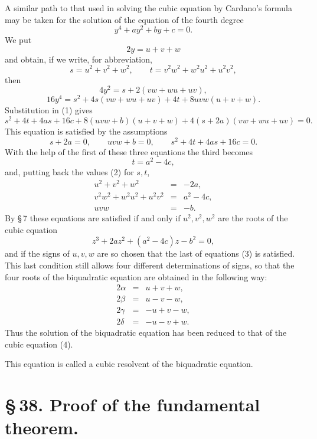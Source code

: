 \documentclass[11pt]{article}
\begin{document}
A similar path to that used in solving the cubic equation by Cardano's formula may be taken for the solution of the equation of the fourth degree
\begin{equation}
 y^4+ay^2+by+c=0.
\tag{1}
\end{equation}
We put
\[
 2y=u+v+w
\]
and obtain, if we write, for abbreviation,
\begin{equation}
 s=u^2+v^2+w^2,\qquad
 t=v^2w^2+w^2u^2+u^2v^2,
\tag{2}
\end{equation}
then
\[
 4y^2=s+2(vw+wu+uv),
\]
\[
 16y^4=s^2+4s(vw+wu+uv)+4t+8uvw(u+v+w).
\]
Substitution in (1) gives
\[
 s^2+4t+4as+16c+8(uvw+b)(u+v+w)
  +4(s+2a)(vw+wu+uv)=0.
\]
This equation is satisfied by the assumptions
\[
 s+2a=0,\qquad uvw+b=0,\qquad s^2+4t+4as+16c=0.
\]
With the help of the first of these three equations the third becomes
\[
 t=a^2-4c,
\]
and, putting back the values (2) for $s,t$,
\begin{equation}
\begin{array}{rcl}
 u^2+v^2+w^2&=&-2a,\\
 v^2w^2+w^2u^2+u^2v^2&=&a^2-4c,\\
 uvw&=&-b.
\end{array}
\tag{3}
\end{equation}
By \S\,7 these equations are satisfied if and only if $u^2,v^2,w^2$ are the roots of the cubic equation
\begin{equation}
 z^3+2az^2+(a^2-4c)z-b^2=0,
\tag{4}
\end{equation}
and if the signs of $u,v,w$ are so chosen that the last of equations (3) is satisfied. This last condition still allows four different determinations of signs, so that the four roots of the biquadratic equation are obtained in the following way:
\begin{equation}
\begin{array}{rcl}
2\alpha&=&u+v+w,\\
2\beta&=&u-v-w,\\
2\gamma&=&-u+v-w,\\
2\delta&=&-u-v+w.
\end{array}
\tag{5}
\end{equation}
Thus the solution of the biquadratic equation has been reduced to that of the cubic equation (4).

This equation is called a cubic resolvent of the biquadratic equation.

\section*{\S\,38. Proof of the fundamental theorem.}
\end{document}
